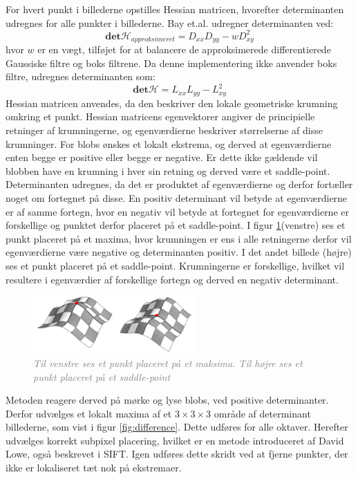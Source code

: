 For hvert punkt i billederne opstilles Hessian matricen, hvorefter determinanten udregnes for alle punkter i billederne. Bay et.al. udregner determinanten ved:
\begin{equation}
\textbf{det}\mathcal{H}_{approksimeret} = D_{xx}D_{yy}-wD_{xy}^2
\label{deerminantofhessian}
\end{equation}
hvor $w$ er en vægt, tilføjet for at balancere de approksimerede differentierede Gaussiske filtre og boks filtrene. Da denne implementering ikke anvender boks filtre, udregnes determinanten som:
\begin{equation}
\textbf{det}\mathcal{H} = L_{xx}L_{yy}-L_{xy}^2
\label{deerminantofhessian}
\end{equation}
Hessian matricen anvendes, da den beskriver den lokale geometriske krumning omkring et punkt. Hessian matricens egenvektorer angiver de principielle retninger af krumningerne, og egenværdierne beskriver størrelserne af disse krumninger. For blobs ønskes et lokalt ekstrema, og derved at egenværdierne enten begge er positive eller begge er negative. Er dette ikke gældende vil blobben have en krumning i hver sin retning og derved være et saddle-point. Determinanten udregnes, da det er produktet af egenværdierne og derfor fortæller noget om fortegnet på disse. En positiv determinant vil betyde at egenværdierne er af samme fortegn, hvor en negativ vil betyde at fortegnet for egenværdierne er forskellige og punktet derfor placeret på et saddle-point. I figur \ref{fig:konkav}(venstre) ses et punkt placeret på et maxima, hvor krumningen er ens i alle retningerne derfor vil egenværdierne være negative og determinanten positiv. I det andet billede (højre) ses et punkt placeret på et saddle-point. Krumningerne er forskellige, hvilket vil resultere i egenværdier af forskellige fortegn og derved en negativ determinant. 
\begin{figure}[H]
    \centering
    \includegraphics[width=0.55\textwidth]{fig/36.png}
     \vspace{-0.5em}
    \begin{center}    
       \caption{\textcolor{gray}{\footnotesize \textit{Til venstre ses et punkt placeret på et maksima. Til højre ses et punkt placeret på et saddle-point}}}
    \label{fig:konkav}
     \end{center}
     \vspace{-1.5em}
  \end{figure} \noindent
Metoden reagere derved på mørke og lyse blobs, ved positive determinanter. Derfor udvælges et lokalt maxima af et $3\times3\times3$ område af determinant billederne, som vist i figur \ref{fig:difference}. Dette udføres for alle oktaver. Herefter udvælges korrekt subpixel placering, hvilket er en metode introduceret af David Lowe, også beskrevet i SIFT. Igen udføres dette skridt ved at fjerne punkter, der ikke er lokaliseret tæt nok på ekstremaer.
